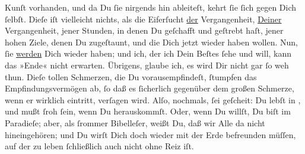                Kunſt vorhanden, und da Du ſie nirgends hin ableiteſt, kehrt ſie ſich gegen Dich
               ſelbſt. Dieſe \label{K_L02649-2v}\label{K_L02649-2}
               iſt vielleicht nichts, als die Eiferſucht \uline{der}
               Vergangenheit, \uline{Deiner} Vergangenheit, jener Stunden,
               in denen Du geſchafft und geſtrebt haſt, jener hohen Ziele, denen Du zugeſtaunt, und
               die Dich jetzt wieder haben wollen. Nun, ſie \uline{werden}
               Dich wieder haben; und ich, der ich Dein Beſtes ſehe und will, kann das »Ende« nicht
               erwarten. Übrigens, glaube ich, es wird Dir nicht gar ſo weh thun. Dieſe tollen
               Schmerzen, die Du vorausempfindeſt, {\pb}ſtumpfen das
               Empfindungsvermögen ab, ſo daß es ſicherlich gegenüber dem großen Schmerze, wenn er
               wirklich eintritt, verſagen wird. Alſo, nochmals, ſei geſcheit: Du lebſt in \label{K_L02649-3v}\label{K_L02649-3},
               und mußt ſroh ſein, wenn Du herauskommſt. Oder, wenn Du willſt, Du biſt im Paradieſe;
               aber, als ſrommer Bibelleſer,  weißt Du, daß wir Alle da nicht hineingehören; und Du wirſt Dich doch wieder
               mit der Erde befreunden müſſen, auf der zu leben ſchließlich auch nicht ohne Reiz
               iſt.\pend
           
